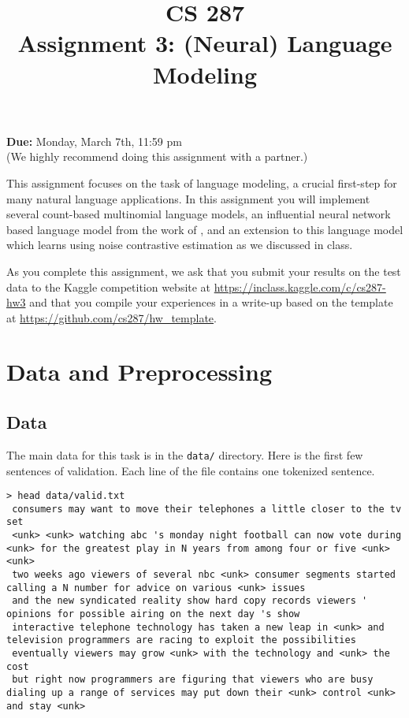 \documentclass[11pt]{article}
\title{CS 287 \\ Assignment 3: (Neural) Language Modeling }
\date{}
\begin{document}
\maketitle{}

\begin{center}
  \textbf{Due:} Monday, March 7th, 11:59 pm \\
  (We highly recommend doing this assignment with a partner.)
\end{center}


This assignment focuses on the task of language modeling, a crucial
first-step for many natural language applications. In this assignment you
will implement several count-based multinomial language models, an
influential neural network based language model from the work of
\citet{DBLP:journals/jmlr/BengioDVJ03}, and an extension to this
language model which learns using noise contrastive estimation as we discussed in
class.


As you complete this assignment, we ask that you submit your results
on the test data to the Kaggle competition website at
\url{https://inclass.kaggle.com/c/cs287-hw3} and that you compile your
experiences in a write-up based on the template at
\url{https://github.com/cs287/hw_template}.

\section{Data and Preprocessing}

\subsection{Data}

The main data for this task is in the \texttt{data/} directory. Here
is the first few sentences of validation. Each line of the file
contains one tokenized sentence.

\lstset{ basicstyle=\ttfamily, breaklines=true}

\begin{lstlisting}
> head data/valid.txt 
 consumers may want to move their telephones a little closer to the tv set 
 <unk> <unk> watching abc 's monday night football can now vote during <unk> for the greatest play in N years from among four or five <unk> <unk> 
 two weeks ago viewers of several nbc <unk> consumer segments started calling a N number for advice on various <unk> issues 
 and the new syndicated reality show hard copy records viewers ' opinions for possible airing on the next day 's show 
 interactive telephone technology has taken a new leap in <unk> and television programmers are racing to exploit the possibilities 
 eventually viewers may grow <unk> with the technology and <unk> the cost 
 but right now programmers are figuring that viewers who are busy dialing up a range of services may put down their <unk> control <unk> and stay <unk> 

\end{lstlisting}
\end{document}
